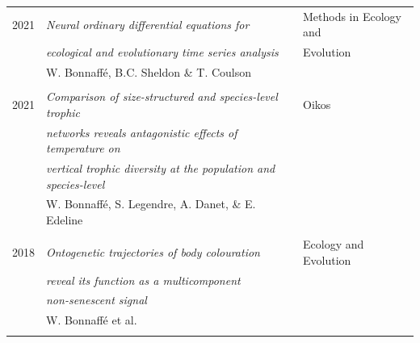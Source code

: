 \documentclass[11pt, oneside]{article}   	%
\begin{document}
\begin{tabular}{rll}
\\
2021 & \textit{Neural ordinary differential equations for} & Methods in Ecology and \\ 
& \textit{ecological and evolutionary time series analysis} & Evolution \\
& W. Bonnaff\'e, B.C. Sheldon \& T. Coulson & \\
\\
2021 & \textit{Comparison of size-structured and species-level trophic} & Oikos \\ 
& \textit{networks reveals antagonistic effects of temperature on} & \\
& \textit{vertical trophic diversity at the population and species-level} & \\
& W. Bonnaff\'e, S. Legendre, A. Danet, \& E. Edeline & \\
\\
2018 & \textit{Ontogenetic trajectories of body colouration} & Ecology and Evolution \\ 
& \textit{reveal its function as a multicomponent} & \\
& \textit{non-senescent signal} &  \\
& W. Bonnaff\'e et al. \\
\\
\end{tabular}
\end{document}

